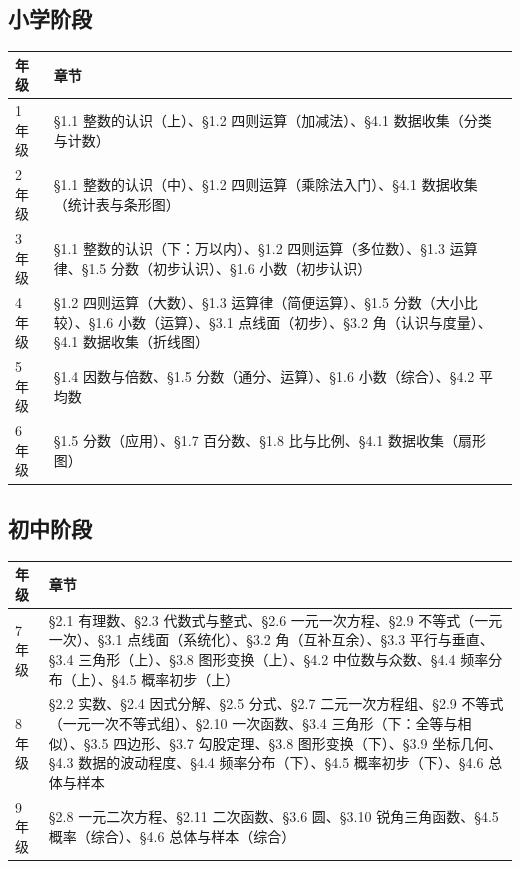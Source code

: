 \subsection*{小学阶段}


\begin{center}
\begin{tabular}{ll}
\toprule
年级 & 章节 \\
\midrule
1 年级 & §1.1 整数的认识（上）、§1.2 四则运算（加减法）、§4.1 数据收集（分类与计数） \\
2 年级 & §1.1 整数的认识（中）、§1.2 四则运算（乘除法入门）、§4.1 数据收集（统计表与条形图） \\
3 年级 & §1.1 整数的认识（下：万以内）、§1.2 四则运算（多位数）、§1.3 运算律、§1.5 分数（初步认识）、§1.6 小数（初步认识） \\
4 年级 & §1.2 四则运算（大数）、§1.3 运算律（简便运算）、§1.5 分数（大小比较）、§1.6 小数（运算）、§3.1 点线面（初步）、§3.2 角（认识与度量）、§4.1 数据收集（折线图） \\
5 年级 & §1.4 因数与倍数、§1.5 分数（通分、运算）、§1.6 小数（综合）、§4.2 平均数 \\
6 年级 & §1.5 分数（应用）、§1.7 百分数、§1.8 比与比例、§4.1 数据收集（扇形图） \\
\bottomrule
\end{tabular}
\end{center}


\subsection*{初中阶段}


\begin{center}
\begin{tabular}{ll}
\toprule
年级 & 章节 \\
\midrule
7 年级 & §2.1 有理数、§2.3 代数式与整式、§2.6 一元一次方程、§2.9 不等式（一元一次）、§3.1 点线面（系统化）、§3.2 角（互补互余）、§3.3 平行与垂直、§3.4 三角形（上）、§3.8 图形变换（上）、§4.2 中位数与众数、§4.4 频率分布（上）、§4.5 概率初步（上） \\
8 年级 & §2.2 实数、§2.4 因式分解、§2.5 分式、§2.7 二元一次方程组、§2.9 不等式（一元一次不等式组）、§2.10 一次函数、§3.4 三角形（下：全等与相似）、§3.5 四边形、§3.7 勾股定理、§3.8 图形变换（下）、§3.9 坐标几何、§4.3 数据的波动程度、§4.4 频率分布（下）、§4.5 概率初步（下）、§4.6 总体与样本 \\
9 年级 & §2.8 一元二次方程、§2.11 二次函数、§3.6 圆、§3.10 锐角三角函数、§4.5 概率（综合）、§4.6 总体与样本（综合） \\
\bottomrule
\end{tabular}
\end{center}

